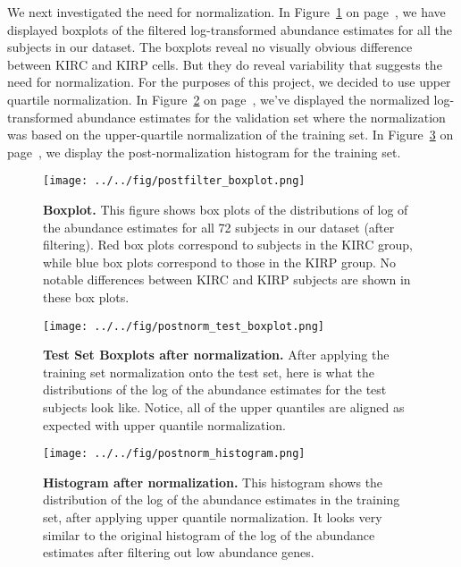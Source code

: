 We next investigated the need for normalization.  In Figure~\ref{fig:boxplot}
on page~\pageref{fig:boxplot}, we have displayed boxplots of the filtered
log-transformed abundance estimates for all the subjects in our dataset.  The
boxplots reveal no visually obvious difference between KIRC and KIRP cells.
But they do reveal variability that suggests the need for normalization.
For the purposes of this project, we decided to use upper quartile normalization.
In Figure~\ref{fig:boxplotpost} on page~\pageref{fig:boxplotpost}, we've displayed
the normalized log-transformed abundance estimates for the validation set where
the normalization was based on the upper-quartile normalization of the training
set.  In Figure~\ref{fig:histogrampost} on page~\pageref{fig:histogrampost},
we display the post-normalization histogram for the training set. 

\begin{figure}[H]
  \centering
    \texttt{[image: ../../fig/postfilter\_boxplot.png]}
\caption{\textbf{Boxplot.} This figure shows box plots of the distributions of
  log of the abundance estimates for all 72 subjects in our dataset (after filtering). Red 	box
  plots correspond to subjects in the KIRC group, while blue box plots correspond
  to those in the KIRP group. No notable differences between KIRC and KIRP
  subjects are shown in these box plots.}
   \label{fig:boxplot}
\end{figure}


\begin{figure}[H]
  \centering
    \texttt{[image: ../../fig/postnorm\_test\_boxplot.png]}
\caption{\textbf{Test Set Boxplots after normalization.} After applying the training
  set normalization onto the test set, here is what the distributions of the
  log of the abundance estimates for the test subjects look like. Notice, all of the upper quantiles
  are aligned as expected with upper quantile normalization.}
   \label{fig:boxplotpost}
\end{figure}


\begin{figure}[H]
  \centering
    \texttt{[image: ../../fig/postnorm\_histogram.png]}
\caption{\textbf{Histogram after normalization.} This histogram shows the distribution
  of the log of the abundance estimates in the training set, after applying upper quantile
  normalization. It looks very similar to the original histogram of the
  log of the abundance estimates after filtering out low abundance genes.}
   \label{fig:histogrampost}
\end{figure}

